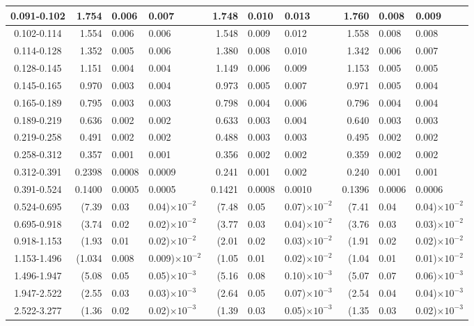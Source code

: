 \begin{table}[!htbp]
{\begin{tabular}{ | c | r@{$\pm$}l@{$\pm$}l | r@{$\pm$}l@{$\pm$}l |  r@{$\pm$}l@{$\pm$}l |  }
0.091-0.102 & 1.754&0.006&0.007 & 1.748&0.010&0.013 & 1.760&0.008&0.009 \\ \hline
0.102-0.114 & 1.554&0.006&0.006 & 1.548&0.009&0.012 & 1.558&0.008&0.008 \\ \hline
0.114-0.128 & 1.352&0.005&0.006 & 1.380&0.008&0.010 & 1.342&0.006&0.007 \\ \hline
0.128-0.145 & 1.151&0.004&0.004 & 1.149&0.006&0.009 & 1.153&0.005&0.005 \\ \hline
0.145-0.165 & 0.970&0.003&0.004 & 0.973&0.005&0.007 & 0.971&0.005&0.004 \\ \hline
0.165-0.189 & 0.795&0.003&0.003 & 0.798&0.004&0.006 & 0.796&0.004&0.004 \\ \hline
0.189-0.219 & 0.636&0.002&0.002 & 0.633&0.003&0.004 & 0.640&0.003&0.003 \\ \hline
0.219-0.258 & 0.491&0.002&0.002 & 0.488&0.003&0.003 & 0.495&0.002&0.002 \\ \hline
0.258-0.312 & 0.357&0.001&0.001 & 0.356&0.002&0.002 & 0.359&0.002&0.002 \\ \hline
0.312-0.391 & 0.2398&0.0008&0.0009 & 0.241&0.001&0.002 & 0.240&0.001&0.001 \\ \hline
0.391-0.524 & 0.1400&0.0005&0.0005 & 0.1421&0.0008&0.0010 & 0.1396&0.0006&0.0006 \\ \hline
0.524-0.695 & (7.39&0.03&0.04)$\times 10^{-2}$ & (7.48&0.05&0.07)$\times 10^{-2}$ & (7.41&0.04&0.04)$\times 10^{-2}$ \\ \hline
0.695-0.918 & (3.74&0.02&0.02)$\times 10^{-2}$ & (3.77&0.03&0.04)$\times 10^{-2}$ & (3.76&0.03&0.03)$\times 10^{-2}$ \\ \hline
0.918-1.153 & (1.93&0.01&0.02)$\times 10^{-2}$ & (2.01&0.02&0.03)$\times 10^{-2}$ & (1.91&0.02&0.02)$\times 10^{-2}$ \\ \hline
1.153-1.496 & (1.034&0.008&0.009)$\times 10^{-2}$ & (1.05&0.01&0.02)$\times 10^{-2}$ & (1.04&0.01&0.01)$\times 10^{-2}$ \\ \hline
1.496-1.947 & (5.08&0.05&0.05)$\times 10^{-3}$ & (5.16&0.08&0.10)$\times 10^{-3}$ & (5.07&0.07&0.06)$\times 10^{-3}$ \\ \hline
1.947-2.522 & (2.55&0.03&0.03)$\times 10^{-3}$ & (2.64&0.05&0.07)$\times 10^{-3}$ & (2.54&0.04&0.04)$\times 10^{-3}$ \\ \hline
2.522-3.277 & (1.36&0.02&0.02)$\times 10^{-3}$ & (1.39&0.03&0.05)$\times 10^{-3}$ & (1.35&0.03&0.02)$\times 10^{-3}$ \\ \hline
\end{tabular}}
\end{table}
